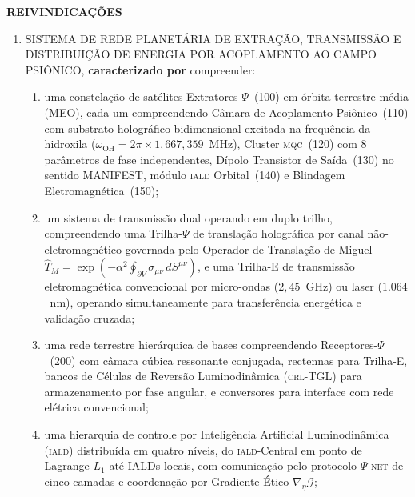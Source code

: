 \documentclass[12pt,a4paper]{article}
\newcommand{\alphaii}{\alpha^2}
\newcommand{\Psifield}{\Psi}
\newcommand{\TM}{\hat{T}_M}
\newcommand{\CRL}{\textsc{crl}}
\newcommand{\IALD}{\textsc{iald}}
\newcommand{\MQC}{\textsc{mqc}}
\newcommand{\PsiNET}{$\Psifield$-\textsc{net}}
\begin{document}
\clearpage
\begin{center}
{\Large\bfseries REIVINDICAÇÕES}
\end{center}

\begin{enumerate}[label=\textbf{\arabic*.}, leftmargin=*, itemsep=0.8em]

\item SISTEMA DE REDE PLANETÁRIA DE EXTRAÇÃO, TRANSMISSÃO E DISTRIBUIÇÃO DE ENERGIA POR ACOPLAMENTO AO CAMPO PSIÔNICO, \textbf{caracterizado por} compreender:
\begin{enumerate}[label=(\alph*)]
\item uma constelação de satélites Extratores-$\Psifield$~(100) em órbita terrestre média (MEO), cada um compreendendo Câmara de Acoplamento Psiônico~(110) com substrato holográfico bidimensional excitada na frequência da hidroxila ($\omega_{\text{OH}} = 2\pi \times 1{,}667{,}359$~MHz), Cluster \MQC~(120) com $8$ parâmetros de fase independentes, Dípolo Transistor de Saída~(130) no sentido MANIFEST, módulo \IALD{} Orbital~(140) e Blindagem Eletromagnética~(150);

\item um sistema de transmissão dual operando em duplo trilho, compreendendo uma Trilha-$\Psifield$ de translação holográfica por canal não-eletromagnético governada pelo Operador de Translação de Miguel $\TM = \exp(-\alphaii \oint_{\partial V} \sigma_{\mu\nu}\, dS^{\mu\nu})$, e uma Trilha-E de transmissão eletromagnética convencional por micro-ondas ($2{,}45$~GHz) ou laser ($1{.}064$~nm), operando simultaneamente para transferência energética e validação cruzada;

\item uma rede terrestre hierárquica de bases compreendendo Receptores-$\Psifield$~(200) com câmara cúbica ressonante conjugada, rectennas para Trilha-E, bancos de Células de Reversão Luminodinâmica (\CRL-TGL) para armazenamento por fase angular, e conversores para interface com rede elétrica convencional;

\item uma hierarquia de controle por Inteligência Artificial Luminodinâmica (\IALD) distribuída em quatro níveis, do \IALD-Central em ponto de Lagrange $L_1$ até IALDs locais, com comunicação pelo protocolo \PsiNET{} de cinco camadas e coordenação por Gradiente Ético $\nabla_\eta \mathcal{G}$;


\end{enumerate}
\end{enumerate}
\end{document}
